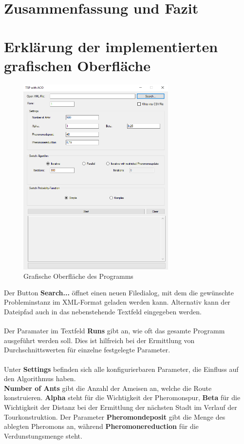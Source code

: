 \documentclass[doktyp=barbeit, sprache=german]{TUBAFarbeiten}
\begin{document}
\section{Zusammenfassung und Fazit}
\newpage
\appendix
\section{Erklärung der implementierten grafischen Oberfläche}
\begin{figure}
\captionsetup{justification=centering}
  \centering
     \includegraphics[width=0.7\textwidth]{images/TSPACOGUI.png}
  \caption{Grafische Oberfläche des Programms}
  \label{img:gui}
\end{figure}
Der Button \textbf{Search...} öffnet einen neuen Filedialog, mit dem die gewünschte Probleminstanz im XML-Format geladen werden kann. Alternativ kann der Dateipfad auch in das nebenstehende Textfeld eingegeben werden.
\\\\Der Paramater im Textfeld \textbf{Runs} gibt an, wie oft das gesamte Programm ausgeführt werden soll. Dies ist hilfreich bei der Ermittlung von Durchschnittswerten für einzelne festgelegte Parameter.
\\\\Unter \textbf{Settings} befinden sich alle konfigurierbaren Parameter, die Einfluss auf den Algorithmus haben. 
\\\textbf{Number of Ants} gibt die Anzahl der Ameisen an, welche die Route konstruieren. \textbf{Alpha} steht für die Wichtigkeit der Pheromonspur, \textbf{Beta} für die Wichtigkeit der Distanz bei der Ermittlung der nächsten Stadt im Verlauf der Tourkonstruktion. Der Parameter \textbf{Pheromondeposit} gibt die Menge des ablegten Pheromons an, während \textbf{Pheromonereduction} für die Verdunstungsmenge steht.
\end{document}
